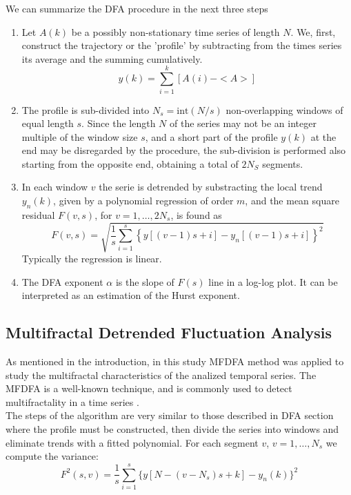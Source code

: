 \documentclass[onecolumn, preprint,aps,amsmath, amssymb, superscriptaddress]{revtex4}
\begin{document}
We can summarize the DFA procedure in the next three steps

\begin{enumerate}
\item Let $A(k)$ be a possibly non-stationary time series of length $N$. We, first, construct the trajectory or the 'profile' by subtracting from the times series its average and the summing cumulatively.
\begin{equation}
y(k) = \sum_{i=1}^{k}[A(i)-<A>]
\label{profile}
\end{equation} 
\item The profile is sub-divided into $N_s=\text{int}(N/s)$ non-overlapping windows of equal length $s$. Since the length $N$ of the series may not be an integer multiple of the window size $s$, and a short part of the profile $y(k)$ at the end may be disregarded by the procedure, the sub-division is performed also starting from the opposite end, obtaining a total of $2N_S$ segments.

\item In each window $v$ the serie is detrended by substracting the local trend $y_n(k)$, given by a polynomial regression of order $m$,  and the mean square residual $F(v,s)$, for $v=1,\dots,2N_s$, is found as
\begin{equation}
F(v,s) = \sqrt{\dfrac{1}{s}\displaystyle\sum_{i=1}^{s}\left\lbrace y[(v-1)s+i]-y_n[(v-1)s+i]\right\rbrace^2}
\end{equation}
Typically the regression is linear.  
\item The DFA exponent $\alpha$ is the slope of $F(s)$ line in a log-log plot. It can be interpreted as an estimation of the Hurst exponent.
\end{enumerate}

\subsection{Multifractal Detrended Fluctuation Analysis}

As mentioned in the introduction, in this study MFDFA method was applied to study the multifractal characteristics of the analized temporal series. The MFDFA is a well-known technique, and is commonly used to detect multifractality in a time series \cite{Kantelhardt}. \\
The steps of the algorithm are very similar to those described in DFA section where the profile must be constructed, then divide the series into windows and eliminate trends with a fitted polynomial. For each segment $v$, $v=1,\ldots,N_s$  we compute the variance:
\begin{equation}
 	F^2 (s,v)=\frac{1}{s} \sum_{i=1}^s\{y[N-(v-N_s )s+k]-y_n (k)\}^2
 	\label{eq:var2}
\end{equation}
\end{document}

